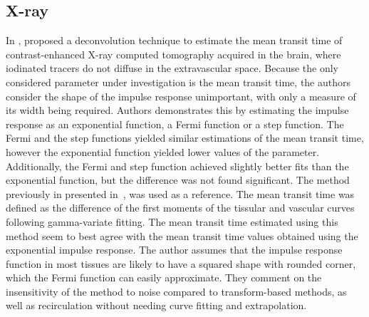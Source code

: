 \subsection{X-ray}
In \citeyear{Axel:1982wu}, \citet{Axel:1982wu} proposed a deconvolution technique to estimate the mean transit time of contrast-enhanced X-ray computed tomography acquired in the brain, where iodinated tracers do not diffuse in the extravascular space. 
Because the only considered parameter under investigation is the mean transit time, the authors consider the shape of the impulse response unimportant, with only a measure of its width being required.
Authors demonstrates this by estimating the impulse response as an exponential function, a Fermi function or a step function. 
The Fermi and the step functions yielded similar estimations of the mean transit time, however the exponential function yielded lower values of the parameter.
Additionally, the Fermi and step function achieved slightly better fits than the exponential function, but the difference was not found significant.
The method previously in presented in~\cite{Axel:1980jg}, was used as a reference. 
The mean transit time was defined as the difference of the first moments of the tissular and vascular curves following gamma-variate fitting.
The mean transit time estimated using this method seem to best agree with the mean transit time values obtained using the exponential impulse response.
The author assumes that the impulse response function in most tissues are likely to have a squared shape with rounded corner, which the Fermi function can easily approximate.
They comment on the insensitivity of the method to noise compared to transform-based methods, as well as recirculation without needing curve fitting and extrapolation.

